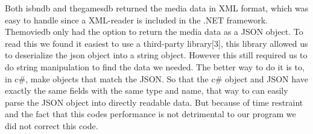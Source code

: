 Both isbndb and thegamesdb returned the media data in XML format, which was easy to handle since a XML-reader is included in the .NET framework. Themoviedb only had the option to return the media data as a JSON object. To read this we found it easiest to use a third-party library[3], this library allowed us to deserialize the json object into a string object. However this still required us to do string manipulation to find the data we needed. The better way to do it is to, in c#, make objects that match the JSON. So that the c# object and JSON have exactly the same fields with the same type and name, that way to can easily parse the JSON object into directly readable data. But because of time restraint and the fact that this codes performance is not detrimental to our program we did not correct this code.



